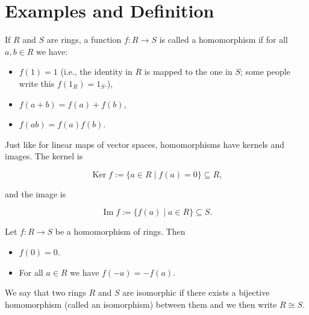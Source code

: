 \section{Examples and Definition}

\begin{definition}[Homomorphism]
If \(R\) and \(S\) are rings, a function \(f: R \rightarrow S\) is called a homomorphism if for all \(a, b \in R\) we have:
\begin{itemize}
\item[1.] \(f(1)=1\) (i.e., the identity in \(R\) is mapped to the one in \(S\); some people write this \(f\left(1_R\right)=1_S\).),
\item[2.] \(f(a+b)=f(a)+f(b)\),
\item[3.] \(f(a b)=f(a) f(b)\).
\end{itemize}

Just like for linear maps of vector spaces, homomorphisms have kernels and images. The kernel is

\[
\operatorname{Ker} f:=\{a \in R \mid f(a)=0\} \subseteq R,
\]

and the image is

\[
\operatorname{Im} f:=\{f(a) \mid a \in R\} \subseteq S .
\]
\end{definition}

\begin{lemma}
Let \(f: R \rightarrow S\) be a homomorphism of rings. Then
\begin{itemize}
\item[1.] \(f(0)=0\).
\item[2.] For all \(a \in R\) we have \(f(-a)=-f(a)\).
\end{itemize}
\end{lemma}

\begin{proofidea}
  
\end{proofidea}
  
\begin{formalproof}
  
\end{formalproof}

\begin{definition}[Isomorphic]
We say that two rings \(R\) and \(S\) are isomorphic if there exists a bijective homomorphism (called an isomorphism) between them and we then write \(R \cong S\).
\end{definition}

